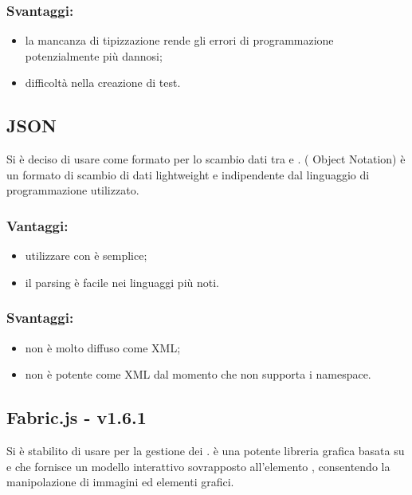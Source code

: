 \documentclass[a4paper, titlepage]{article}
\begin{document}
\subsubsection{Svantaggi:} 
\begin{itemize}
	\item la mancanza di tipizzazione rende gli errori di programmazione potenzialmente più dannosi;
	\item difficoltà nella creazione di test.
\end{itemize}

\subsection{JSON}
Si è deciso di usare  come formato per lo scambio dati tra  e .  ( Object Notation) è un formato di scambio di dati lightweight e indipendente dal linguaggio di programmazione utilizzato.

\subsubsection{Vantaggi:} 
\begin{itemize}
	\item utilizzare  con  è semplice;
	\item il parsing è facile nei linguaggi più noti.
\end{itemize}

\subsubsection{Svantaggi:}
	\begin{itemize}
	\item non è molto diffuso come XML;
	\item non è potente come XML dal momento che non supporta i namespace.
	\end{itemize}

\subsection{Fabric.js - v1.6.1}
Si è stabilito di usare  per la gestione dei .  è una potente libreria grafica basata su  e  che fornisce un modello interattivo sovrapposto all'elemento , consentendo la manipolazione di immagini ed elementi grafici.
\end{document}
